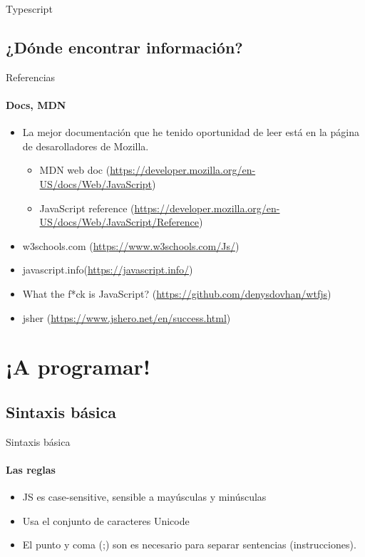 \documentclass[aspectratio=169]{beamer}
\begin{document}
\begin{darkframes}
\begin{frame}{Typescript}
    \end{frame}
    \subsection{¿Dónde encontrar información?}
    \begin{frame}{Referencias}
      \framesubtitle{Docs, MDN}
      \begin{itemize}
        \item La mejor documentación que he tenido oportunidad de leer está en la página  de desarolladores de Mozilla.
        \begin{itemize}
          \item MDN web doc (\url{https://developer.mozilla.org/en-US/docs/Web/JavaScript})
          \item JavaScript reference (\url{https://developer.mozilla.org/en-US/docs/Web/JavaScript/Reference})
        \end{itemize}
        \item w3schools.com (\url{https://www.w3schools.com/Js/})
        \item javascript.info(\url{https://javascript.info/})
        \item What the f*ck is JavaScript? (\url{https://github.com/denysdovhan/wtfjs})
        \item jsher (\url{https://www.jshero.net/en/success.html})

      \end{itemize}

    \end{frame}

    \section{¡A programar!}
    \subsection{Sintaxis básica}
    \begin{frame}{Sintaxis básica}
      \framesubtitle{Las reglas}
      \begin{itemize}
        \item JS es case-sensitive, sensible a mayúsculas y minúsculas
        \item Usa el conjunto de caracteres Unicode
        \item El punto y coma (;) son es necesario para separar sentencias (instrucciones).
      \end{itemize}


\end{frame}
\end{darkframes}
\end{document}
